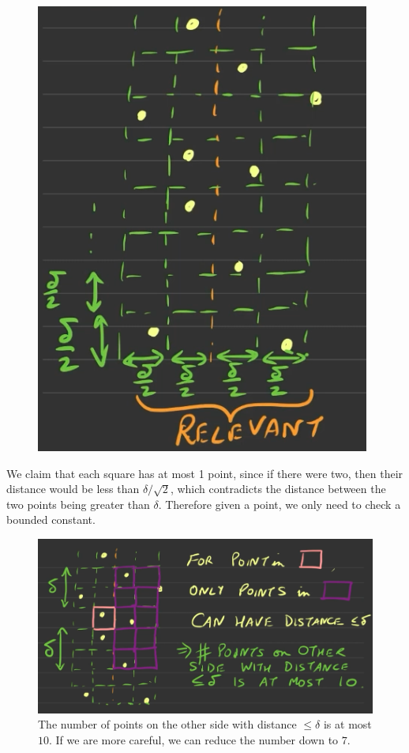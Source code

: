   \begin{figure}[H]
    \centering 
    \includegraphics[scale=0.4]{img/cp3.png}
    \caption{} 
    \label{fig:closest_point3}
  \end{figure}

  We claim that each square has at most 1 point, since if there were two, then their distance would be less than $\delta / \sqrt{2}$, which contradicts the distance between the two points being greater than $\delta$. Therefore given a point, we only need to check a bounded constant. 

  \begin{figure}[H]
    \centering 
    \includegraphics[scale=0.4]{img/cp4.png}
    \caption{The number of points on the other side with distance $\leq \delta$ is at most $10$. If we are more careful, we can reduce the number down to $7$. } 
    \label{fig:closest_point4}
  \end{figure}

